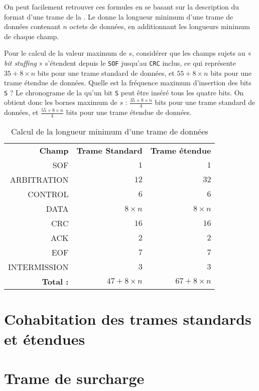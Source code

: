 On peut facilement retrouver ces formules en se basant sur la description du format d'une trame de la . Le  donne la longueur minimum d'une trame de données contenant $n$ octets de données, en additionnant les longueurs minimum de chaque champ.

Pour le calcul de la valeur maximum de $s$, considérer que les champs sujets au « \emph{bit stuffing} » s'étendent depuis le \texttt{SOF} jusqu'au \texttt{CRC} inclus, ce qui représente $35 + 8 \times n$ bits pour une trame standard de données, et $55 + 8 \times n$ bits pour une trame étendue de données. Quelle est la fréquence maximum d'insertion des bits \texttt{S} ? Le chronograme de la  qu'un bit \texttt{S} peut être inséré tous les quatre bits. On obtient donc les bornes maximum de $s$ : $\frac{35 + 8 \times n}{4}$ bits pour une trame standard de données, et $\frac{55 + 8 \times n}{4}$ bits pour une trame étendue de données.




\begin{table}[!t]
  \small
  \centering
  \begin{tabular}{rrr}
    \textbf{Champ}& \textbf{Trame Standard} & \textbf{Trame étendue} \\
    SOF & $1$ & $1$ \\
    ARBITRATION & $12$ & $32$ \\
    CONTROL & $6$ & $6$ \\
    DATA & $8\times n$ & $8\times n$ \\
    CRC & $16$ & $16$ \\
    ACK & $2$ & $2$ \\
    EOF & $7$ & $7$ \\
    INTERMISSION & $3$ & $3$ \\
    {\bf Total :} & $47 + 8\times n$ & $67 + 8\times n$ \\
   \end{tabular}
  \caption{Calcul de la longueur minimum d'une trame de données}
  \ligne
\end{table}




 









\section{Cohabitation des trames standards et étendues}








\section{Trame de surcharge}




